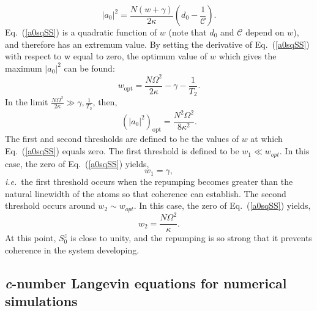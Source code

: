 \documentclass[aps,
twocolumn,
superscriptaddress,groupedaddress]{revtex4}
\begin{document}
\begin{equation}
|a_0|^2=\frac{N(w+\gamma)}{2 \kappa} (d_0 - \frac{1}{\mathcal{C}}).
\label{a0sqSS}
\end{equation}
Eq.~(\ref{a0sqSS}) is a quadratic function of $w$ (note that $d_0$ and
$\mathcal C$ depend on $w$), and therefore has an extremum value. By
setting the derivative of Eq.~(\ref{a0sqSS}) with respect to w equal
to zero, the optimum value of $w$ which gives the maximum $|a_0|^2$
can be found:
\begin{equation}
w_{\mathrm{opt}} = \frac{N \Omega^2}{2\kappa} - \gamma - \frac{1}{T_2}.
\label{wopt}
\end{equation}
In the limit $\frac{N\Omega^2}{2 \kappa} \gg \gamma, \frac{1}{T_2}$, then,
\begin{equation}
(|a_0|^2)_{\mathrm{opt}}= \frac{N^2 \Omega^2}{8\kappa^2}.
\label{adaopt}
\end{equation}
The first and second thresholds are defined to be the values of $w$ at
which Eq.~(\ref{a0sqSS}) equals zero. The first threshold is defined
to be $w_1 \ll w_{opt}$. In this case, the zero of Eq.~(\ref{a0sqSS})
yields,
\begin{equation}
w_1 = \gamma,
\label{FirstThreshold}
\end{equation} 
{\em i.e.}\ the first threshold occurs
when the repumping becomes greater than the natural linewidth of the
atoms so that coherence can establish.  The second
threshold occurs around $w_2 \sim w_{opt}$. In this case,
the zero of Eq.~(\ref{a0sqSS}) yields,
\begin{equation}
w_2 =  \frac{N \Omega^2}{\kappa}.
\end{equation} 
At this point, $S_0^{z}$ is close to unity, and the repumping is so
strong that it prevents coherence in the system developing.


\subsection{{\it c}-number Langevin equations for numerical simulations}
\end{document}
